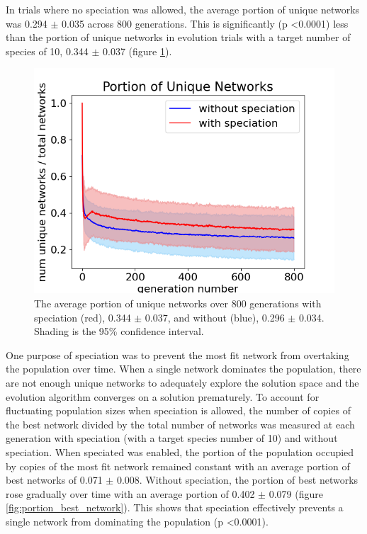 \documentclass[12pt]{report}
\begin{document}
In trials where no speciation was allowed, the average portion of unique networks was 0.294 $\pm$ 0.035 across 800 generations. This is significantly (p \textless 0.0001) less than the portion of unique networks in evolution trials with a target number of species of 10, 0.344 $\pm$ 0.037 (figure \ref{fig:num_unique_species}).

\begin{figure}
\centering
    \includegraphics[width=15cm]{images/num_unique_networks.png}
    \caption[Unique networks with and without speciation]{The average portion of unique networks over 800 generations with speciation (red), 0.344 $\pm$ 0.037, and without (blue), 0.296 $\pm$ 0.034. Shading is the 95\% confidence interval.}
    \label{fig:num_unique_species}
\end{figure}

One purpose of speciation was to prevent the most fit network from overtaking the population over time. When a single network dominates the population, there are not enough unique networks to adequately explore the solution space and the evolution algorithm converges on a solution prematurely. To account for fluctuating population sizes when speciation is allowed, the number of copies of the best network divided by the total number of networks was measured at each generation with speciation (with a target species number of 10) and without speciation.  When speciated was enabled, the portion of the population occupied by copies of the most fit network
remained constant with an average portion of best networks of 0.071 $\pm$ 0.008. Without speciation, the portion of best networks rose gradually over time with an average portion of 0.402 $\pm$ 0.079 (figure \ref{fig:portion_best_network}). This shows that speciation effectively prevents a single network from dominating the population (p \textless 0.0001).
\end{document}
